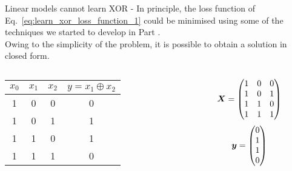\begin{frame}[t,allowframebreaks]{Linear models cannot learn XOR -}
    In principle, the loss function of Eq.~\ref{eq:learn_xor_loss_function_1} 
    could be minimised using some of the techniques we started 
    to develop in Part \prevpart.\\
    
    Owing to the simplicity of the problem, 
    it is possible to obtain a solution in closed form.

    \framebreak

    \begin{columns}[t]
        \begin{column}{0.40\textwidth}
            \vspace{-1.2cm}
            \begin{center}
                \begin{tabular}{ c c c | c }
                 $x_0$ & $x_1$ & $x_2$ & $y = x_1 \oplus x_2$ \\ 
                 \hline
                 1 & 0 & 0 & 0 \\  
                 1 & 0 & 1 & 1 \\   
                 1 & 1 & 0 & 1 \\  
                 1 & 1 & 1 & 0 \\   
                \end{tabular}
            \end{center}
        \end{column}
        \begin{column}{0.60\textwidth}
            \begin{equation*}
                \boldsymbol{X} = 
                \begin{pmatrix}
                    1 & 0 & 0 \\
                    1 & 0 & 1 \\
                    1 & 1 & 0 \\
                    1 & 1 & 1 \\
                \end{pmatrix} 
            \end{equation*}        
            \begin{equation*}
                \boldsymbol{y} = 
                \begin{pmatrix}
                    0 \\
                    1 \\
                    1 \\
                    0 \\
                \end{pmatrix} 
            \end{equation*}        
        

\end{column}
\end{columns}
\end{frame}
